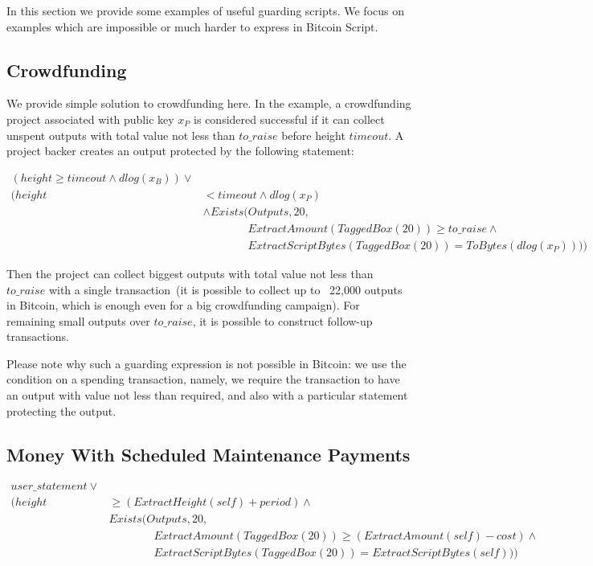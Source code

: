 \documentclass[]{llncs}
\newcommand{\authnote}[2]{\marginpar{\parbox{\marginparwidth}{\tiny %
  \textsf{#1 {\textcolor{blue}{notes: #2}}}}}%
  \textcolor{blue}{\textbf{\dag}}}
\newcommand{\authnote}[2]{
  \textsf{#1 \textcolor{blue}{: #2}}}
\newcommand{\authnote}[2]{}
\newcommand{\knote}[1]{{\authnote{\textcolor{green}{kushti notes}}{#1}}}
\begin{document}
In this section we provide some examples of useful guarding scripts. We focus on examples which are impossible or much harder to express in Bitcoin Script.

\subsection{Crowdfunding}
\label{sec:crowdfunding}

We provide simple solution to crowdfunding here. In the example, a crowdfunding project associated with public key $x_P$ is considered successful if it can collect unspent outputs with total value not less than $to\_raise$ before height $timeout$. A project backer creates an output protected by the following statement: 

\begin{equation*}
\begin{split}
(height \ge timeout \land dlog(x_B)) \lor \\
(height & < timeout \land dlog(x_P)\\
& \land Exists(Outputs, 20,\\ 
& \quad \quad \quad \quad ExtractAmount(TaggedBox(20)) \ge to\_raise \land \\ 
& \quad \quad \quad \quad ExtractScriptBytes(TaggedBox(20)) = ToBytes(dlog(x_P))))
\end{split}
\end{equation*}

Then the project can collect biggest outputs with total value not less than $to\_raise$ with a single transaction~(it is possible to collect up to ~22,000 outputs in Bitcoin, which is enough even for a big crowdfunding campaign). For remaining small outputs over $to\_raise$, it is possible to construct follow-up transactions. 

Please note why such a guarding expression is not possible in Bitcoin: we use the condition on a spending transaction, namely, we require the transaction to have an output with value not less than required, and also with a particular statement protecting the output.

\subsection{Money With Scheduled Maintenance Payments}

\knote{description}

\begin{equation*}
\begin{split}
user\_statement \lor \\ 
(height & \ge (ExtractHeight(self) + period) \land \\
    & Exists(Outputs, 20, \\
    & \quad \quad \quad \quad ExtractAmount(TaggedBox(20)) \ge (ExtractAmount(self) - cost) \land \\ 
    & \quad \quad \quad \quad ExtractScriptBytes(TaggedBox(20)) = ExtractScriptBytes(self)))
\end{split}
\end{equation*}
\end{document}

